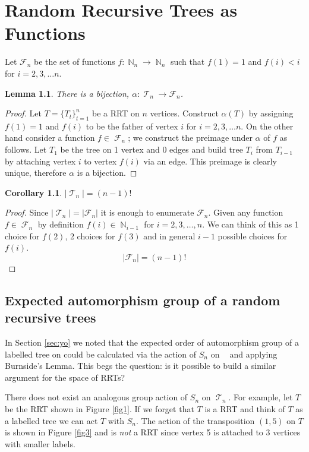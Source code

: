 \documentclass[oneside]{book} %
\newtheorem{lem}[thm]{Lemma}
\newtheorem{cor}[thm]{Corollary}
\theoremstyle{definition}
\numberwithin{equation}{section}
\DeclareMathOperator{\T}{\mathcal{T}}
\DeclareMathOperator{\lT}{\tilde{\mathcal{T}}_n}
\DeclareMathOperator{\N}{\mathbb{N}}
\DeclareMathOperator{\F}{\mathcal{F}}
\begin{document}
\chapter{Random Recursive Trees as Functions}\label{chap:Joyal}
Let $\mathcal{F}_n$ be the set of functions $f: \N_n \longrightarrow \N_n$ such that $f(1) = 1$ and $f(i) <i$ for $i = 2,3,\dots n$.

\begin{lem}
  There is a bijection, $\alpha: \T_n \rightarrow \mathcal{F}_n$.
\end{lem}

\begin{proof}  Let $T = \{T_t\}_{t=1}^n$ be a RRT on $n$ vertices.  Construct $\alpha(T)$ by assigning $f(1) = 1$ and $f(i)$ 
to be the father of vertex $i$ for $i = 2,3,\dots n$. On the other hand consider a function $f \in \F_n$; we construct the
preimage under $\alpha$ of $f$ as follows. Let $T_1$ be the tree on 1 vertex and 0 edges and build tree $T_i$ from $T_{i-1}$ by attaching vertex $i$ to vertex $f(i)$ via an edge. This preimage is clearly unique, therefore $\alpha$ is a bijection.     
\end{proof}

\begin{cor}
$\lvert \T_n \rvert =  (n-1)!$
\end{cor}
\begin{proof}
 Since $\lvert \T_n \rvert = \lvert \mathcal{F}_n \rvert$ it is enough to enumerate $\mathcal{F}_n$.  
Given any function $f \in \F_n$ by definition $f(i) \in \N_{i-1}$ for $i= 2,3,\dots,n$.  We can think of this as 1 choice for $f(2)$, 
2 choices for $f(3)$ and in general $i-1$ possible choices for $f(i)$.  
\[ \lvert \mathcal{F}_n \rvert = (n-1)!\]
\end{proof}




\section{Expected automorphism group of a random recursive trees}
In Section \ref{sec:yo} we noted that the expected order of automorphism group of a labelled tree on could be calculated via
the action of $S_n$ on $\lT$ and applying Burnside's Lemma.  This begs the question: is it possible to build a similar argument for the space of RRTs? 

There does not exist an analogous group action of $S_n$ on $\T_n$. For example, let $T$ be the RRT shown in Figure \ref{fig1}.
If we forget that $T$ is a RRT and think of $T$ as a labelled tree we can act $T$ with $S_n$.  The action of the 
transposition $(1,5)$ on $T$ is shown in Figure \ref{fig3} and is \emph{not} a RRT since vertex 5 is attached to 3 vertices with smaller labels. 
\end{document}
